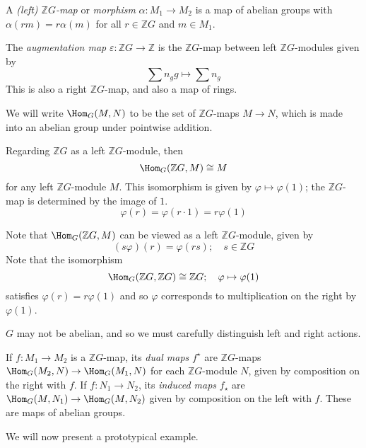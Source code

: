 \begin{definition}
    A \emph{(left) \( \mathbb Z G \)-map} or \emph{morphism} \( \alpha : M_1 \to M_2 \) is a map of abelian groups with \( \alpha(r m) = r \alpha(m) \) for all \( r \in \mathbb Z G \) and \( m \in M_1 \).
\end{definition}
\begin{example}
    The \emph{augmentation map} \( \varepsilon : \mathbb Z G \to \mathbb Z \) is the \( \mathbb Z G \)-map between left \( \mathbb Z G \)-modules given by
    \[ \sum n_g g \mapsto \sum n_g \]
    This is also a right \( \mathbb Z G \)-map, and also a map of rings.
\end{example}
We will write \( \Hom_G(M, N) \) to be the set of \( \mathbb Z G \)-maps \( M \to N \), which is made into an abelian group under pointwise addition.
\begin{example}
    Regarding \( \mathbb Z G \) as a left \( \mathbb Z G \)-module, then
    \[ \Hom_G(\mathbb Z G, M) \cong M \]
    for any left \( \mathbb Z G \)-module \( M \).
    This isomorphism is given by \( \varphi \mapsto \varphi(1) \); the \( \mathbb Z G \)-map is determined by the image of \( 1 \).
    \[ \varphi(r) = \varphi(r \cdot 1) = r \varphi(1) \]
\end{example}
Note that \( \Hom_G(\mathbb Z G, M) \) can be viewed as a left \( \mathbb Z G \)-module, given by
\[ (s \varphi)(r) = \varphi(rs);\quad s \in \mathbb Z G \]
Note that the isomorphism
\[ \Hom_G(\mathbb Z G, \mathbb Z G) \cong \mathbb Z G;\quad \varphi \mapsto \varphi(1) \]
satisfies \( \varphi(r) = r \varphi(1) \) and so \( \varphi \) corresponds to multiplication on the right by \( \varphi(1) \).
\begin{remark}
    \( G \) may not be abelian, and so we must carefully distinguish left and right actions.
\end{remark}
\begin{definition}
    If \( f : M_1 \to M_2 \) is a \( \mathbb Z G \)-map, its \emph{dual maps} \( f^\star \) are \( \mathbb Z G \)-maps \( \Hom_G(M_2, N) \to \Hom_G(M_1, N) \) for each \( \mathbb Z G \)-module \( N \), given by composition on the right with \( f \).
    If \( f : N_1 \to N_2 \), its \emph{induced maps} \( f_\star \) are \( \Hom_G(M, N_1) \to \Hom_G(M, N_2) \) given by composition on the left with \( f \).
    These are maps of abelian groups.
\end{definition}
We will now present a prototypical example.
